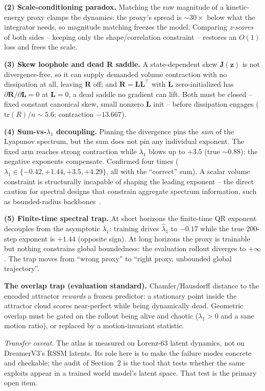 \documentclass[11pt]{article}
\newcommand{\zdyn}{\boldsymbol{z}}
\begin{document}
\textbf{(2) Scale-conditioning paradox.} Matching the raw magnitude of a
kinetic-energy proxy clamps the dynamics: the proxy's spread is
$\sim30\times$ below what the integrator needs, so magnitude matching
freezes the model. Comparing \emph{z-scores} of both sides -- keeping only
the shape/correlation constraint -- restores an $O(1)$ loss and frees the
scale.

\textbf{(3) Skew loophole and dead R saddle.} A state-dependent skew
$\mathbf{J}(\zdyn)$ is not divergence-free, so it can supply demanded volume
contraction with no dissipation at all, leaving $\mathbf{R}$ off; and
$\mathbf{R} = \mathbf{L}\mathbf{L}^\top$ with $\mathbf{L}$ zero-initialized
has $\partial\mathbf{R}/\partial\mathbf{L} = 0$ at $\mathbf{L}=0$, a dead
saddle no gradient can lift. Both must be closed -- fixed constant canonical
skew, small nonzero $\mathbf{L}$ init -- before dissipation engages
($\mathrm{tr}(R)/n \sim 5.6$; contraction $-13.667$).

\textbf{(4) Sum-vs-$\lambda_1$ decoupling.} Pinning the divergence pins the
\emph{sum} of the Lyapunov spectrum, but the sum does not pin any individual
exponent. The fixed arm reaches strong contraction while $\lambda_1$ blows
up to $+3.5$ (true $\sim0.88$): the negative exponents compensate. Confirmed
four times ($\lambda_1 \in \{-0.42, +1.44, +3.5, +4.29\}$, all with the
``correct'' sum). A scalar volume constraint is structurally incapable of
shaping the leading exponent -- the direct caution for spectral designs that
constrain aggregate spectrum information, such as bounded-radius
backbones~\cite{koopman2026}.

\textbf{(5) Finite-time spectral trap.} At short horizons the finite-time QR
exponent decouples from the asymptotic $\lambda_1$: training drives
$\hat\lambda_1$ to $-0.17$ while the true 200-step exponent is $+1.44$
(opposite sign). At long horizons the proxy is trainable but nothing
constrains global boundedness: the evaluation rollout diverges to
$+\infty$. The trap moves from ``wrong proxy'' to ``right proxy, unbounded
global trajectory''.

\textbf{The overlap trap (evaluation standard).} Chamfer/Hausdorff distance
to the encoded attractor \emph{rewards} a frozen predictor: a stationary
point inside the attractor cloud scores near-perfect while being dynamically
dead. Geometric overlap must be gated on the rollout being alive and chaotic
($\lambda_1 > 0$ and a sane motion ratio), or replaced by a
motion-invariant statistic.

\emph{Transfer caveat.} The atlas is measured on Lorenz-63 latent dynamics,
not on DreamerV3's RSSM latents. Its role here is to make the failure modes
concrete and checkable; the audit of Section~2 is the tool that tests
whether the same exploits appear in a trained world model's latent space.
That test is the primary open item.
\end{document}
